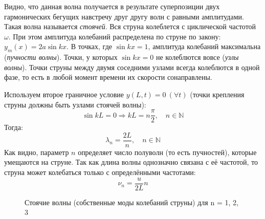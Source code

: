 \documentclass[
a4paper, %
12pt, %
]{article}
\begin{document}
	Видно, что данная волна получается в результате суперпозиции двух гармонических бегущих навстречу друг другу волн с равными амплитудами. Такая волна называется \textit{стоячей}. Вся струна колеблется с циклической частотой $\omega$. При этом амплитуда колебаний распределена по струне по закону: $y_m(x) = 2 a \sin{kx}$. В точках, где $\sin{kx} = 1$, амплитуда колебаний максимальна (\textit{пучности волны}). Точки, у которых $\sin{kx} = 0$ не колеблются вовсе (\textit{узлы волны}). Точки струны между двумя соседними узлами всегда колеблются в одной фазе, то есть в любой момент времени их скорости сонаправлены.
		
	Используем второе граничное условие $y(L, t) = 0 \ (\forall t)$ (точки крепления
	струны должны быть узлами стоячей волны):
	\begin{equation}
		\sin{kL} = 0 \Rightarrow kL = n\frac{\pi}{2}, \quad n \in \mathbb {N} 
	\end{equation}
	Тогда:
	\begin{equation}
		\lambda_n = \frac{2L}{n}, \quad n \in \mathbb{N}
	\end{equation}
	Как видно, параметр $n$ определяет число полуволн (то есть пучностей), которые умещаются на струне. Так как длина волны однозначно связана с её частотой, то струна может колебаться только с определёнными частотами:
	\begin{equation}\label{eq12}
		\nu_n = \frac{u}{2L} n
	\end{equation}
	
	\begin{figure}[h]
		\caption{Стоячие волны (собственные моды колебаний струны) для n = 1, 2, 3}
		\label{standing_waves}
	\end{figure}
	
\end{document}
